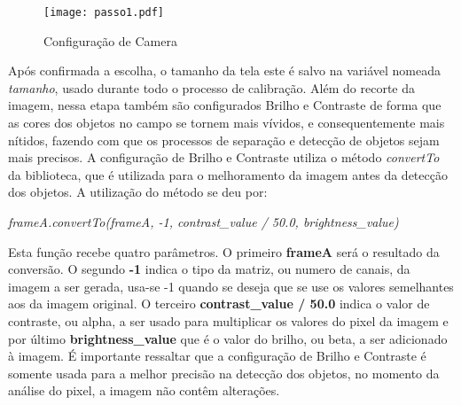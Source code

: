 \begin{figure}[H]
			\centering
			\texttt{[image: passo1.pdf]}
			\caption{ Configuração de Camera}
			\label{Configuracao}
		\end{figure}		


 Após confirmada a escolha, o tamanho da tela 
este é salvo na variável nomeada \emph{tamanho}, usado durante todo o processo de calibração.
Além do recorte da imagem, nessa etapa também são configurados Brilho e Contraste de forma que as cores dos objetos no campo se tornem mais vívidos, e consequentemente mais nítidos, fazendo com que os processos de separação e detecção de objetos sejam mais precisos. A configuração de Brilho e Contraste utiliza o método \textit{convertTo} da biblioteca, que é utilizada para o melhoramento da imagem antes da detecção dos objetos. A utilização do método se deu por:
\begin{center}
\centering \textit{ frameA.convertTo(frameA, -1, contrast\_value / 50.0, brightness\_value)}
\end{center}
Esta função recebe quatro parâmetros. O primeiro \textbf{frameA} será o resultado da conversão. O segundo \textbf{-1} indica o tipo da matriz, ou numero de canais, da imagem a ser gerada, usa-se -1 quando se deseja que se use os valores semelhantes aos da imagem original\cite{OpenCV}. O terceiro \textbf{contrast\_value / 50.0} indica o valor de contraste, ou alpha, a ser usado para multiplicar os valores do pixel da imagem\cite{OpenCV} e por último \textbf{brightness\_value} que é o valor do brilho, ou beta, a ser adicionado à imagem. É importante ressaltar que a configuração de Brilho e Contraste é somente usada para a melhor precisão na detecção dos objetos, no momento da análise do pixel, a imagem não contêm alterações.\newline

